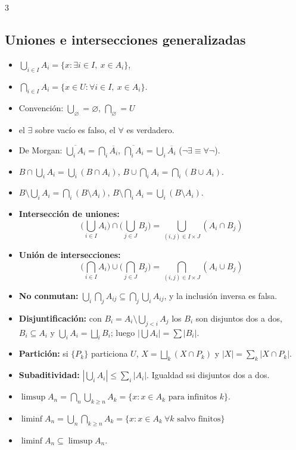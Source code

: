 \documentclass[8pt, spanish, mexico, letterpaper]{extarticle}
\newcommand{\<}{<}
\newcommand{\ov}[1]{\overline{#1}}
\newcommand{\card}[1]{\left|#1\right|}
\begin{document}
\begin{multicols*}{3}
\subsection{Uniones e intersecciones generalizadas}
\begin{itemize}
  \item $\bigcup_{i\in I}A_i=\{x:\exists i\in I,\ x\in A_i\}$, 
  \item $\bigcap_{i\in I}A_i=\{x\in U:\forall i\in I,\ x\in A_i\}$.
  \item Convenci\'on: $\bigcup_{\varnothing}=\varnothing$, \; $\bigcap_{\varnothing}=U$ 
  \item el $\exists$ sobre vac\'io es falso, el $\forall$ es verdadero.
  \item De Morgan: $\ov{\bigcup_iA_i}=\bigcap_i\ov{A_i}$, \quad $\ov{\bigcap_iA_i}=\bigcup_i\ov{A_i}$ \quad ($\lnot\exists\equiv\forall\lnot$).
  \item $B\cap\bigcup_iA_i=\bigcup_i(B\cap A_i)$, \quad $B\cup\bigcap_iA_i=\bigcap_i(B\cup A_i)$.
  \item $B\setminus\bigcup_iA_i=\bigcap_i(B\setminus A_i)$, \quad $B\setminus\bigcap_iA_i=\bigcup_i(B\setminus A_i)$.
  \item \textbf{Intersecci\'on de uniones:}
        $$\Big(\bigcup_{i\in I}A_i\Big)\cap\Big(\bigcup_{j\in J}B_j\Big)=\bigcup_{(i,j)\in I\times J}(A_i\cap B_j)$$
  \item \textbf{Uni\'on de intersecciones:}
        $$\Big(\bigcap_{i\in I}A_i\Big)\cup\Big(\bigcap_{j\in J}B_j\Big)=\bigcap_{(i,j)\in I\times J}(A_i\cup B_j)$$
  \item \textbf{No conmutan:}
        $\bigcup_i\bigcap_jA_{ij}\subseteq\bigcap_j\bigcup_iA_{ij}$, y la inclusi\'on inversa es falsa.
  \item \textbf{Disjuntificaci\'on:} con $B_i=A_i\setminus\bigcup_{j<i}A_j$ los $B_i$ son disjuntos dos a dos,
        $B_i\subseteq A_i$ y $\bigcup_iA_i=\bigsqcup_iB_i$; luego $\card{\bigcup A_i}=\sum\card{B_i}$.
  \item \textbf{Partici\'on:} si $\{P_k\}$ particiona $U$, $X=\bigsqcup_k(X\cap P_k)$ y $\card X=\sum_k\card{X\cap P_k}$.
  \item \textbf{Subaditividad:} $\card{\bigcup_iA_i}\le\sum_i\card{A_i}$.  Igualdad ssi disjuntos dos a dos.
  \item $\limsup A_n=\bigcap_n\bigcup_{k\ge n}A_k=\{x: x\in A_k\text{ para infinitos }k\}$.
  \item $\liminf A_n=\bigcup_n\bigcap_{k\ge n}A_k=\{x: x\in A_k\ \forall k\text{ salvo finitos}\}$
  \item $\liminf A_n\subseteq\limsup A_n$.
\end{itemize}
 

\end{multicols*}
\end{document}
